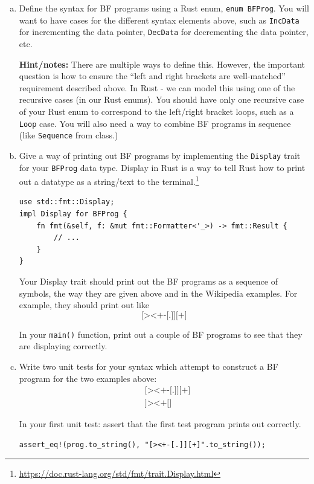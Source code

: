 \documentclass{article}
\begin{document}
\begin{enumerate}
\begin{enumerate}[(a)]
\item
Define the syntax for BF programs using a Rust enum, \texttt{enum BFProg}.
You will want to have cases for the different syntax elements above, such as \texttt{IncData} for incrementing the data pointer, \texttt{DecData} for decrementing the data pointer, etc.

\textbf{Hint/notes:} There are multiple ways to define this. However, the important question is how to ensure
the ``left and right brackets are well-matched'' requirement described above.
In Rust - we can model this using one of the recursive cases (in our Rust enums).
You should have only one recursive case of your Rust enum to correspond to the left/right bracket loops,
such as a \texttt{Loop} case.
You will also need a way to combine BF programs in sequence (like \texttt{Sequence} from class.)

\item
Give a way of printing out BF programs by implementing the \texttt{Display} trait for your \texttt{BFProg} data type.
Display in Rust is a way to tell Rust how to print out a datatype as a string/text to the terminal.\footnote{\url{https://doc.rust-lang.org/std/fmt/trait.Display.html}}
\begin{verbatim}
use std::fmt::Display;
impl Display for BFProg {
    fn fmt(&self, f: &mut fmt::Formatter<'_>) -> fmt::Result {
        // ...
    }
}
\end{verbatim}

Your Display trait should print out the BF programs as a sequence of symbols, the way they are given above and in the Wikipedia examples. For example, they should print out like
$$
\texttt{[><+-[.]][+]}
$$

In your \texttt{main()} function, print out a couple of BF programs to see that they are displaying correctly.

\item
Write two unit tests for your syntax which attempt to construct a BF program for the two examples above:
\begin{align*}
&\texttt{[><+-[.]][+]} \\
&\texttt{]><+[]}
\end{align*}

In your first unit test: assert that the first test program prints out correctly.
\begin{verbatim}
assert_eq!(prog.to_string(), "[><+-[.]][+]".to_string());
\end{verbatim}


\end{enumerate}
\end{enumerate}
\end{document}
